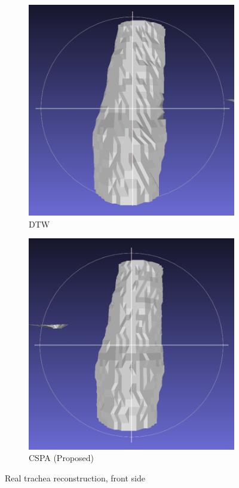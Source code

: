 \documentclass[11p, titlepage]{article}
\begin{document}
\begin{figure}[h!]
     \centering
     \begin{subfigure}[b]{0.45\textwidth}
         \centering
         \includegraphics[width=\textwidth]{reconstructions/dtw-real}
         \caption{DTW}
         \label{fig:dtw_real}
     \end{subfigure}
     \hfill
     \begin{subfigure}[b]{0.45\textwidth}
         \centering
         \includegraphics[width=\textwidth]{reconstructions/cspa50-real}
         \caption{CSPA (Proposed)}
         \label{fig:cspa50_real}
     \end{subfigure}
        \caption{Real trachea reconstruction, front side}
        \label{fig:real_reconstructions}
\end{figure}
\end{document}
